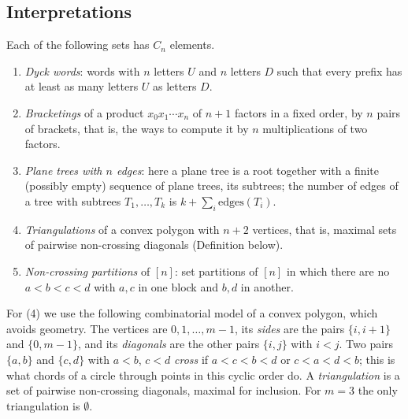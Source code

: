 \subsection{Interpretations}\label{generating-functions:subsection-catalan-interpretations}

\begin{proposition}\label{generating-functions:proposition-catalan-interpretations}
Each of the following sets has $C_n$ elements.
\begin{enumerate}
\item \emph{Dyck words}: words with $n$ letters $U$ and $n$ letters $D$ such that every prefix has at least as many letters $U$ as letters $D$.
\item \emph{Bracketings} of a product $x_0x_1 \cdots x_n$ of $n + 1$ factors in a fixed order, by $n$ pairs of brackets, that is, the ways to compute it by $n$ multiplications of two factors.
\item \emph{Plane trees with $n$ edges}: here a plane tree is a root together with a finite (possibly empty) sequence of plane trees, its subtrees; the number of edges of a tree with subtrees
$T_1, \ldots, T_k$ is $k + \sum_i\mathrm{edges}(T_i)$.
\item \emph{Triangulations} of a convex polygon with $n + 2$ vertices, that is, maximal sets of pairwise non-crossing diagonals (Definition below).
\item \emph{Non-crossing partitions} of $[n]$: set partitions of $[n]$ in which there are no $a < b < c < d$ with $a, c$ in one block and $b, d$ in another.
\end{enumerate}
\end{proposition}

For (4) we use the following combinatorial model of a convex polygon, which avoids geometry. The vertices are $0, 1, \ldots, m - 1$, its \emph{sides} are the pairs $\{i, i + 1\}$ and $\{0, m - 1\}$,
and its \emph{diagonals} are the other pairs $\{i, j\}$ with $i < j$. Two pairs $\{a, b\}$ and $\{c, d\}$ with $a < b$, $c < d$ \emph{cross} if $a < c < b < d$ or $c < a < d < b$; this is what
chords of a circle through points in this cyclic order do. A \emph{triangulation} is a set of pairwise non-crossing diagonals, maximal for inclusion. For $m = 3$ the only triangulation is $\emptyset$.

